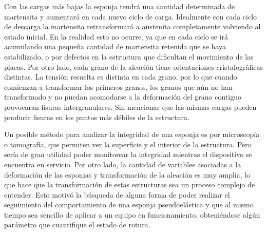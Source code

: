 \documentclass[a4paper,12pt,fleqn,twoside,openany]{book}
\begin{document}
Con las cargas más bajas la esponja tendrá una cantidad determinada de martensita y aumentará en cada nuevo ciclo de carga. Idealmente con cada ciclo de descarga la martensita retransformará a austenita completamente volviendo al estado inicial. En la realidad esto no ocurre, ya que en cada ciclo se irá acumulando una pequeña cantidad de martensita retenida que se haya estabilizado, o por defectos en la estructura que dificultan el movimiento de las placas. Por otro lado, cada grano de la aleación tiene orientaciones cristalográficas distintas. La tensión resuelta es distinta en cada grano, por lo que cuando comienzan a transformar los primeros granos, los granos que aún no han transformado y no puedan acomodarse a la deformación del grano contiguo provocaran fisuras intergranulares. Sin mencionar que las mismas cargas pueden producir fisuras en los puntos más débiles de la estructura. 

Un posible método para analizar la integridad de una esponja es por microscopía o tomografía, que permiten ver la superficie y el interior de la estructura. Pero sería de gran utilidad poder monitorear la integridad mientras el dispositivo se encuentra en servicio. Por otro lado, la cantidad de variables asociadas a la deformación de las esponjas y transformación de la aleación es muy amplia, lo que hace que la transformación de estas estructuras sea un proceso complejo de entender. Esto motivó la búsqueda de alguna forma de poder realizar el seguimiento del comportamiento de una esponja pseudoelástica y que al mismo tiempo sea sencillo de aplicar a un equipo en funcionamiento, obteniéndose algún parámetro que cuantifique el estado de rotura.


\vspace{5mm} %
 
 \hrulefill
 
\vspace{5mm} %
\end{document}
